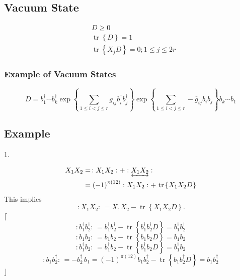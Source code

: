 \documentclass[aps,preprint]{revtex4}%
\begin{document}
\subsection{Vacuum State}%

\begin{align}
&  D\geq0\\
&  \operatorname*{tr}\left\{  D\right\}  =1\\
&  \operatorname*{tr}\left\{  X_{j}D\right\}  =0;1\leq j\leq2r
\end{align}


\subsubsection{Example of Vacuum States}%

\begin{equation}
D=b_{1}^{\dagger}\cdots b_{k}^{\dagger}\exp\left\{
{\textstyle\sum\limits_{1\leq i<j\leq r}}
g_{ij}b_{i}^{\dagger}b_{j}^{\dagger}\right\}  \exp\left\{
{\textstyle\sum\limits_{1\leq i<j\leq r}}
-\overline{g}_{ij}b_{i}b_{j}\right\}  b_{k}\cdots b_{1}%
\end{equation}


\subsection{Example}

1.%

\begin{align}
X_{1}X_{2} &  =\,:X_{1}X_{2}:+:\underleftrightarrow{X_{1}X_{2}}:\\
&  =\left(  -1\right)  ^{\pi\left(  12\right)  }:X_{1}X_{2}%
:+\,\operatorname*{tr}\left\{  X_{1}X_{2}D\right\}
\end{align}
This implies
\begin{equation}
\,:X_{1}X_{2}:\,=X_{1}X_{2}-\operatorname*{tr}\left\{  X_{1}X_{2}D\right\}  .
\end{equation}
$\lceil$%
\begin{equation}
:b_{1}^{\dagger}b_{2}^{\dagger}:\,=b_{1}^{\dagger}b_{2}^{\dagger
}-\operatorname*{tr}\left\{  b_{1}^{\dagger}b_{2}^{\dagger}D\right\}
=b_{1}^{\dagger}b_{2}^{\dagger}%
\end{equation}%
\begin{equation}
:b_{1}b_{2}:\,=b_{1}b_{2}-\operatorname*{tr}\left\{  b_{1}b_{2}D\right\}
=b_{1}b_{2}%
\end{equation}%
\begin{equation}
:b_{1}^{\dagger}b_{2}:\,=b_{1}^{\dagger}b_{2}-\operatorname*{tr}\left\{
b_{1}^{\dagger}b_{2}D\right\}  =b_{1}^{\dagger}b_{2}%
\end{equation}%
\begin{equation}
:b_{1}b_{2}^{\dagger}:\,=-b_{2}^{\dagger}\,b_{1}=\left(  -1\right)
^{\pi\left(  12\right)  }b_{1}b_{2}^{\dagger}-\operatorname*{tr}\left\{
b_{1}b_{2}^{\dagger}D\right\}  =b_{1}b_{2}^{\dagger}%
\end{equation}
$\rfloor$
\end{document}
